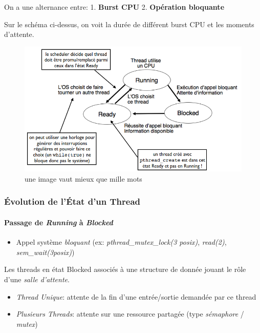 On a une alternance entre: 1. \textbf{Burst CPU} 2. \textbf{Opération
bloquante}

Sur le schéma ci-dessus, on voit la durée de différent burst CPU et les
moments d'attente.

\begin{figure}
\centering
\includegraphics{image-29.png}
\caption{une image vaut mieux que mille mots}
\end{figure}

\subsubsection{Évolution de l'État d'un
Thread}\label{uxe9volution-de-luxe9tat-dun-thread}

\paragraph{\texorpdfstring{Passage de \emph{Running} à
\emph{Blocked}}{Passage de Running à Blocked}}\label{passage-de-running-uxe0-blocked}

\begin{itemize}
\tightlist
\item
  Appel système \emph{bloquant} (ex: \emph{pthread\_mutex\_lock(3
  posix)}, \emph{read(2)}, \emph{sem\_wait(3posix)})
\end{itemize}

Les threads en état Blocked associés à une structure de donnée jouant le
rôle d'une \emph{salle d'attente}.

\begin{itemize}
\tightlist
\item
  \emph{Thread Unique}: attente de la fin d'une entrée/sortie demandée
  par ce thread
\item
  \emph{Plusieurs Threads}: attente sur une ressource partagée (type
  \emph{sémaphore} / \emph{mutex})
\end{itemize}

